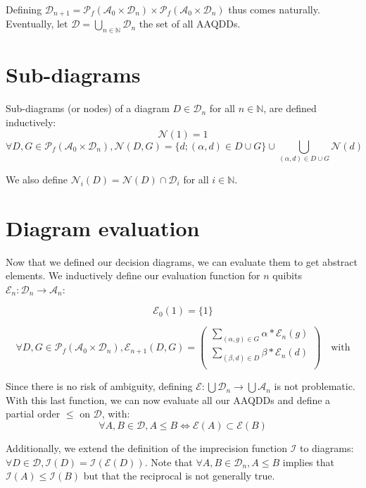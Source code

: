 Defining $\mathcal{D}_{n+1} = \mathscr{P}_f(\mathcal{A}_0 \times \mathcal{D}_n) \times \mathscr{P}_f(\mathcal{A}_0 \times \mathcal{D}_n)$ thus comes naturally. Eventually, let $\mathcal{D} = \bigcup_{n \in \mathbb{N}} \mathcal{D}_n$ the set of all AAQDDs.

\section{Sub-diagrams}

Sub-diagrams (or nodes) of a diagram $D \in \mathcal{D}_n$ for all $n \in \mathbb{N}$, are defined inductively:
$$\mathcal{N}(\boxed{1}) = \boxed{1}$$
$$\forall D, G \in \mathscr{P}_f(\mathcal{A}_0 \times \mathcal{D}_n), \mathcal{N}(D, G) = \{d ; (\alpha, d) \in D \cup G\} \cup
\bigcup_{(\alpha, d) \in D \cup G} \mathcal{N}(d)$$

We also define $\mathcal{N}_i(D) = \mathcal{N}(D) \cap \mathcal{D}_i$ for all $i \in \mathbb{N}$.

\section{Diagram evaluation}

Now that we defined our decision diagrams, we can evaluate them to get abstract elements. We inductively define our evaluation function for $n$ quibits $\mathcal{E}_n : \mathcal{D}_n \rightarrow \mathcal{A}_n$:

$$\mathcal{E}_0(\boxed{1}) = \{1\}$$

$$\forall D, G \in \mathscr{P}_f(\mathcal{A}_0 \times \mathcal{D}_n), \mathcal{E}_{n+1}(D, G) =
\begin{pmatrix}
    \displaystyle\sum_{(\alpha, g) \in G} \alpha * \mathcal{E}_n(g) \\
    \displaystyle\sum_{(\beta, d) \in D} \beta * \mathcal{E}_n(d) \\
\end{pmatrix}
\quad\text{with}
$$

Since there is no risk of ambiguity, defining $\mathcal{E} : \bigcup \mathcal{D}_n \rightarrow \bigcup \mathcal{A}_n$ is not problematic. With this last function, we can now evaluate all our AAQDDs and define a partial order $\le$ on $\mathcal{D}$, with:
$$\forall A, B \in \mathcal{D}, A \le B \iff \mathcal{E}(A) \subset \mathcal{E}(B)$$

Additionally, we extend the definition of the imprecision function $\mathcal{I}$ to diagrams: $\forall D \in \mathcal{D}, \mathcal{I}(D) = \mathcal{I}(\mathcal{E}(D))$. Note that $\forall A, B \in \mathcal{D}_n, A \le B$ implies that $\mathcal{I}(A) \le \mathcal{I}(B)$ but that the reciprocal is not generally true.

